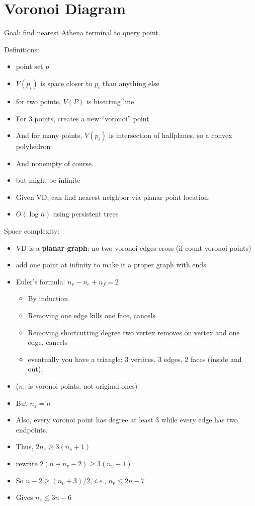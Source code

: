 \documentclass{article}
\begin{document}
\section{Voronoi Diagram}

Goal: find nearest Athena terminal to query point.

Definitions:
\begin{itemize}
\item point set $p$
\item $V(p_i)$ is space closer to $p_i$ than anything else
\item for two points, $V(P)$ is bisecting line
\item For 3 points, creates a new ``voronoi'' point
\item And for many points, $V(p_i)$ is intersection of halfplanes, so
  a convex polyhedron
\item And nonempty of course.
\item but might be infinite
\item Given VD, can find nearest neighbor via planar point location:
\item   $O(\log n)$ using persistent trees
\end{itemize}

Space complexity:
\begin{itemize}
\item VD is a \textbf{ planar graph}: no two voronoi edges cross (if count
  voronoi points)
\item add one point at infinity to make it a proper graph with ends
\item Euler's formula: $n_v-n_e+n_f=2$
\begin{itemize}
\item By induction.  
\item Removing one edge kills one face, cancels
\item Removing shortcutting degree two vertex removes on vertex and
  one edge, cancels
\item eventually you have a triangle: 3 vertices, 3 edges, 2 faces
  (inside and out).
\end{itemize}
\item ($n_v$ is voronoi points, not original ones)
\item But $n_f = n$
\item Also, every voronoi point has degree at least 3 while every edge
  has two endpoints.
\item Thus, $2n_e \ge 3(n_v+1)$
\item rewrite $2(n+n_v-2) \ge 3(n_v+1)$
\item So $n-2 \ge (n_v+3)/2$, \emph{i.e.}, $n_v \le 2n-7$
\item Gives $n_e \le 3n-6$
\end{itemize}
\end{document}
